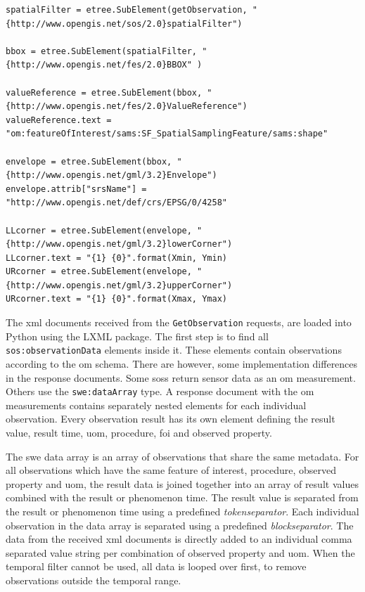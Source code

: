 \begin{lstlisting}[float,caption={Script that creates an LXML graph object called spatialFilter to add to a \texttt{GetObservaton} POST request}, label={lst:getObservation}]
spatialFilter = etree.SubElement(getObservation, "{http://www.opengis.net/sos/2.0}spatialFilter")

bbox = etree.SubElement(spatialFilter, "{http://www.opengis.net/fes/2.0}BBOX" )

valueReference = etree.SubElement(bbox, "{http://www.opengis.net/fes/2.0}ValueReference")
valueReference.text = "om:featureOfInterest/sams:SF_SpatialSamplingFeature/sams:shape"

envelope = etree.SubElement(bbox, "{http://www.opengis.net/gml/3.2}Envelope")
envelope.attrib["srsName"] = "http://www.opengis.net/def/crs/EPSG/0/4258"

LLcorner = etree.SubElement(envelope, "{http://www.opengis.net/gml/3.2}lowerCorner")
LLcorner.text = "{1} {0}".format(Xmin, Ymin)
URcorner = etree.SubElement(envelope, "{http://www.opengis.net/gml/3.2}upperCorner")
URcorner.text = "{1} {0}".format(Xmax, Ymax)
\end{lstlisting}

\begin{sloppypar}
The \ac{xml} documents received from the \texttt{GetObservation} requests, are loaded into Python using the LXML package. The first step is to find all \texttt{sos:observationData} elements inside it. These elements contain observations according to the \ac{om} schema. There are however, some implementation differences in the response documents. Some \aclp{sos} return sensor data as an \ac{om} measurement. Others use the \texttt{swe:dataArray} type. A response document with the \ac{om} measurements contains separately nested elements for each individual observation. Every observation result has its own element defining the result value, result time, \ac{uom}, procedure, \ac{foi} and observed property.  
\end{sloppypar}

The \ac{swe} data array is an array of observations that share the same metadata. For all observations which have the same feature of interest, procedure, observed property and \ac{uom}, the result data is joined together into an array of result values combined with the result or phenomenon time. The result value is separated from the result or phenomenon time using a predefined \textit{tokenseparator}. Each individual observation in the data array is separated using a predefined \textit{blockseparator}. The data from the received \ac{xml} documents is directly added to an individual comma separated value string per combination of observed property and \ac{uom}. When the temporal filter cannot be used, all data is looped over first, to remove observations outside the temporal range. 

